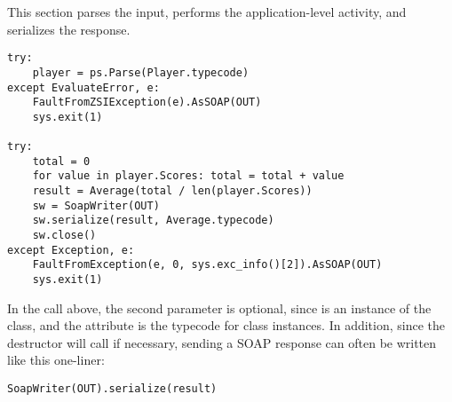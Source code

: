 This section parses the input, performs the application-level
activity, and serializes the response.
\begin{verbatim}
try:
    player = ps.Parse(Player.typecode)
except EvaluateError, e:
    FaultFromZSIException(e).AsSOAP(OUT)
    sys.exit(1)

try:
    total = 0
    for value in player.Scores: total = total + value
    result = Average(total / len(player.Scores))
    sw = SoapWriter(OUT)
    sw.serialize(result, Average.typecode)
    sw.close()
except Exception, e:
    FaultFromException(e, 0, sys.exc_info()[2]).AsSOAP(OUT)
    sys.exit(1)
\end{verbatim}

In the  call above, the second parameter is optional,
since  is an instance of the 
 class, and the  attribute is
the typecode for class instances.
In addition, since the  destructor will call 
if necessary, sending a SOAP response can often be written like
this one-liner:
\begin{verbatim}
SoapWriter(OUT).serialize(result)
\end{verbatim}

